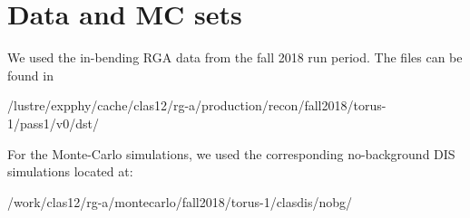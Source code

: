 \section{Data and MC sets}
\label{data}
We used the in-bending RGA data from the fall 2018 run period.  The files can be found in

/lustre/expphy/cache/clas12/rg-a/production/recon/fall2018/torus-1/pass1/v0/dst/

For the Monte-Carlo simulations, we used the corresponding no-background DIS simulations located at:

/work/clas12/rg-a/montecarlo/fall2018/torus-1/clasdis/nobg/
